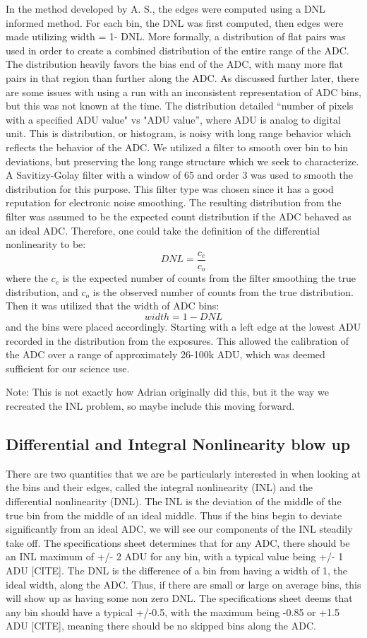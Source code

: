 \documentclass[11pt, letterpaper]{article}
\begin{document}
In the method developed by A. S.,  the edges were computed using a DNL informed method. For each bin, the DNL was first computed, then edges were made utilizing width = 1- DNL. 
More formally, a distribution of flat pairs was used in order to create a combined distribution of the entire range of the ADC. 
The distribution heavily favors the bias end of the ADC, with many more flat pairs in that region than further along the ADC. 
As discussed further later, there are some issues with using a run with an inconsistent representation of ADC bins, but this was not known at the time.
 The distribution detailed “number of pixels with a specified ADU value" vs "ADU value”, where ADU is analog to digital unit. 
 This is distribution, or histogram, is noisy with long range behavior which reflects the behavior of the ADC. 
 We utilized a filter to smooth over bin to bin deviations, but preserving the long range structure which we seek to characterize.  
A Savitizy-Golay filter with a window of 65 and order 3 was used to smooth the distribution for this purpose. 
 This filter type was chosen since it has a good reputation for electronic noise smoothing. 
 The resulting distribution from the filter was assumed to be the expected count distribution if the ADC behaved as an ideal ADC.  
 Therefore, one could take the definition of the differential nonlinearity to be:
 \[ DNL = \frac{c_e}{c_o}\]
where the $c_{e}$ is the expected number of counts from the filter smoothing the true distribution, and $c_{o}$ is the observed number of counts from the true distribution. 
Then it was utilized that the width of ADC bins:
\[ width = 1 - DNL\]  
 and the bins were placed accordingly. 
 Starting with a left edge at the lowest ADU recorded in the distribution from the exposures. 
 This allowed the calibration of the ADC over a range of approximately 26-100k ADU, which was deemed sufficient for our science use. 

Note: This is not exactly how Adrian originally did this, but it the way we recreated the INL problem, so maybe include this moving forward. 

\subsection{Differential and Integral Nonlinearity blow up}
\indent


There are two quantities that we are be particularly interested in when looking at the bins and their edges, called the integral nonlinearity (INL) and the differential nonlinearity (DNL). 
The INL is the deviation of the middle of the true bin from the middle of an ideal middle. 
Thus if the bins begin to deviate significantly from an ideal ADC, we will see our components of the INL steadily take off. 
The specifications sheet determines that for any ADC, there should be an INL maximum of +/- 2 ADU for any bin, with a typical value being +/- 1 ADU [CITE]. 
The DNL is the difference of a bin from having a width of 1, the ideal width, along the ADC. 
Thus, if there are small or large on average bins, this will show up as having some non zero DNL. 
The specifications sheet deems that any bin should have a typical +/-0.5, with the maximum being -0.85 or +1.5 ADU [CITE], meaning there should be no skipped bins along the ADC. 
\indent
\end{document}
